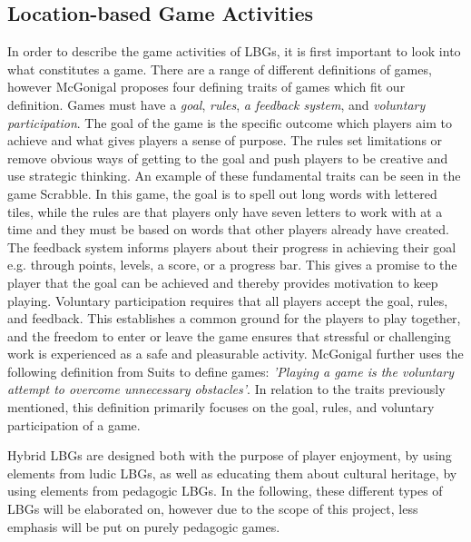 \subsection{Location-based Game Activities}
In order to describe the game activities of LBGs, it is first important to look into what constitutes a game. There are a range of different definitions of games, however McGonigal\cite{RealityIsBroken} proposes four defining traits of games which fit our definition. Games must have a \textit{goal}, \textit{rules}, \textit{a feedback system}, and \textit{voluntary participation}. The goal of the game is the specific outcome which players aim to achieve and what gives players a sense of purpose. The rules set limitations or remove obvious ways of getting to the goal and push players to be creative and use strategic thinking. An example of these fundamental traits can be seen in the game Scrabble. In this game, the goal is to spell out long words with lettered tiles, while the rules are that players only have seven letters to work with at a time and they must be based on words that other players already have created. The feedback system informs players about their progress in achieving their goal e.g. through points, levels, a score, or a progress bar. This gives a promise to the player that the goal can be achieved and thereby provides motivation to keep playing. Voluntary participation requires that all players accept the goal, rules, and feedback. This establishes a common ground for the players to play together, and the freedom to enter or leave the game ensures that stressful or challenging work is experienced as a safe and pleasurable activity. McGonigal \cite{RealityIsBroken} further uses the following definition from Suits\cite{grasshopper} to define games: \emph{'Playing a game is the voluntary attempt to overcome unnecessary obstacles'}. In relation to the traits previously mentioned, this definition primarily focuses on the goal, rules, and voluntary participation of a game. 

Hybrid LBGs are designed both with the purpose of player enjoyment, by using elements from ludic LBGs, as well as educating them about cultural heritage, by using elements from pedagogic LBGs\cite{LBG_Review}. In the following, these different types of LBGs will be elaborated on, however due to the scope of this project, less emphasis will be put on purely pedagogic games.

